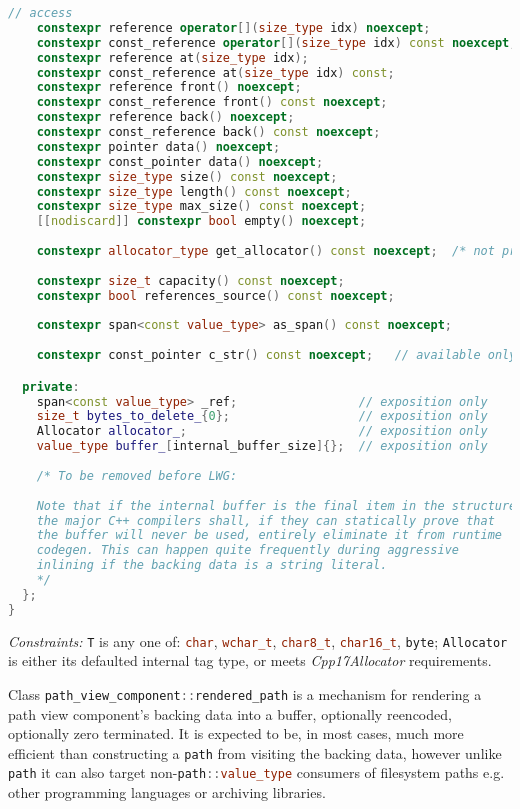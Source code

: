 \documentclass[11pt]{article}
\newcommand{\code}[2][cpp]{\lstinline[language=#1,basicstyle=\small\ttfamily]{#2}}
\newcommand{\desc}[1]{\textit{#1}}
\newcommand{\constraints}{\desc{Constraints: }}
\begin{document}
\begin{lstlisting}[language=cpp]
    // access
    constexpr reference operator[](size_type idx) noexcept;
    constexpr const_reference operator[](size_type idx) const noexcept;
    constexpr reference at(size_type idx);
    constexpr const_reference at(size_type idx) const;
    constexpr reference front() noexcept;
    constexpr const_reference front() const noexcept;
    constexpr reference back() noexcept;
    constexpr const_reference back() const noexcept;
    constexpr pointer data() noexcept;
    constexpr const_pointer data() noexcept;
    constexpr size_type size() const noexcept;
    constexpr size_type length() const noexcept;
    constexpr size_type max_size() const noexcept;
    [[nodiscard]] constexpr bool empty() noexcept;
    
    constexpr allocator_type get_allocator() const noexcept;  /* not present if default_rendered_path_allocator tag type was used */
    
    constexpr size_t capacity() const noexcept;
    constexpr bool references_source() const noexcept;
    
    constexpr span<const value_type> as_span() const noexcept;
    
    constexpr const_pointer c_str() const noexcept;   // available only if null_terminated and non-byte backing

  private:
    span<const value_type> _ref;                 // exposition only
    size_t bytes_to_delete_{0};                  // exposition only
    Allocator allocator_;                        // exposition only
    value_type buffer_[internal_buffer_size]{};  // exposition only
    
    /* To be removed before LWG:
    
    Note that if the internal buffer is the final item in the structure,
    the major C++ compilers shall, if they can statically prove that
    the buffer will never be used, entirely eliminate it from runtime
    codegen. This can happen quite frequently during aggressive
    inlining if the backing data is a string literal.
    */
  };
}
\end{lstlisting}

\constraints \code{T} is any one of: \code{char}, \code{wchar_t}, \code{char8_t}, \code{char16_t}, \code{byte}; \code{Allocator} is either its defaulted internal tag type, or meets \emph{Cpp17Allocator} requirements.

Class \code{path_view_component::rendered_path} is a mechanism for rendering a path view component's backing data into a buffer, optionally reencoded, optionally zero terminated. It is expected to be, in most cases, much more efficient than constructing a \code{path} from visiting the backing data, however unlike \code{path} it can also target non-\code{path::value_type} consumers of filesystem paths e.g. other programming languages or archiving libraries.
\end{document}
